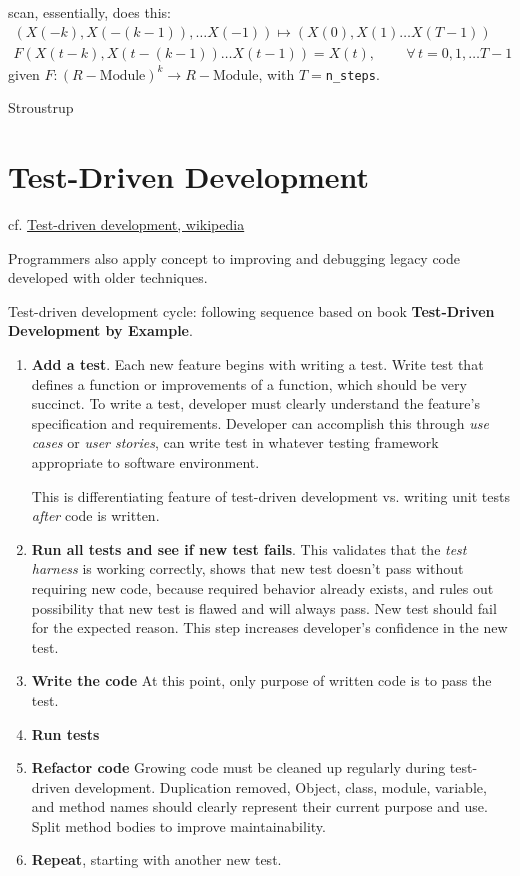 \documentclass[10pt]{amsart}
\begin{document}
\begin{multicols*}{2}
scan, essentially, does this:
\begin{equation}
\begin{gathered}
  (X(-k),X(-(k-1)),\dots X(-1)) \mapsto (X(0),X(1)\dots X(T-1)) \\ 
F(X(t-k), X(t-(k-1))\dots X(t-1)) = X(t), \qquad \, \forall \, t=0,1,\dots T-1
  \end{gathered}
\end{equation}
given $F:(R-\text{Module})^k \to R-\text{Module}$, with $T=$\verb|n_steps|.  


Stroustrup \cite{Stro2013}


\part{Test-Driven Development}

cf. \href{https://en.wikipedia.org/wiki/Test-driven_development}{Test-driven development, wikipedia}  

Programmers also apply concept to improving and debugging legacy code developed with older techniques.  

Test-driven development cycle: following sequence based on book \textbf{Test-Driven Development by Example}.  

\begin{enumerate}
	\item \textbf{Add a test}.  Each new feature begins with writing a test.  Write test that defines a function or improvements of a function, which should be very succinct.  To write a test, developer must clearly understand the feature's specification and requirements.  Developer can accomplish this through \emph{use cases} or \emph{user stories}, can write test in whatever testing framework appropriate to software environment.  
	
	This is differentiating feature of test-driven development vs. writing unit tests \emph{after} code is written.  
	\item \textbf{Run all tests and see if new test fails}.  This validates that the \emph{test harness} is working correctly, shows that new test doesn't pass without requiring new code, because required behavior already exists, and rules out possibility that new test is flawed and will always pass.  New test should fail for the expected reason.  This step increases developer's confidence in the new test.  
	\item \textbf{Write the code} At this point, only purpose of written code is to pass the test.  
	\item \textbf{Run tests}
	\item \textbf{Refactor code} Growing code must be cleaned up regularly during test-driven development.  Duplication removed, Object, class, module, variable, and method names should clearly represent their current purpose and use.  Split method bodies to improve maintainability.  
	\item \textbf{Repeat}, starting with another new test.   
\end{enumerate} 


\end{multicols*}
\end{document}
